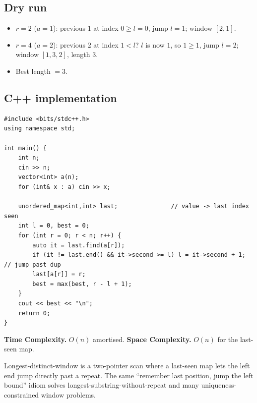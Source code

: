 \subsection*{Dry run}


\begin{itemize}
  \item $r=2$ ($a=1$): previous $1$ at index $0\ge l=0$, jump $l=1$;
        window $[2,1]$.
  \item $r=4$ ($a=2$): previous $2$ at index $1<l$? $l$ is now $1$, so
        $1\ge1$, jump $l=2$; window $[1,3,2]$, length $3$.
  \item Best length $=3$.
\end{itemize}

\subsection*{C++ implementation}

\begin{lstlisting}
#include <bits/stdc++.h>
using namespace std;

int main() {
    int n;
    cin >> n;
    vector<int> a(n);
    for (int& x : a) cin >> x;

    unordered_map<int,int> last;               // value -> last index seen
    int l = 0, best = 0;
    for (int r = 0; r < n; r++) {
        auto it = last.find(a[r]);
        if (it != last.end() && it->second >= l) l = it->second + 1;  // jump past dup
        last[a[r]] = r;
        best = max(best, r - l + 1);
    }
    cout << best << "\n";
    return 0;
}
\end{lstlisting}

\begin{complexitybox}
\textbf{Time Complexity.} $O(n)$ amortised. \textbf{Space Complexity.}
$O(n)$ for the last-seen map.
\end{complexitybox}

\begin{takeawaybox}
Longest-distinct-window is a two-pointer scan where a last-seen map lets the
left end jump directly past a repeat. The same ``remember last position,
jump the left bound'' idiom solves longest-substring-without-repeat and many
uniqueness-constrained window problems.
\end{takeawaybox}
